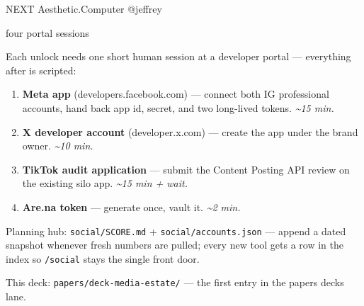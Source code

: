 \documentclass[12pt]{article}
\makeatletter
\newcommand{\ac}{Aesthetic\textcolor{acpink}{.}Computer}
\newenvironment{slide}[2]{%
  \clearpage
  {\footnotesize\color{acgray}\MakeUppercase{#1}\hfill}%
  {\footnotesize\color{acgray}\ac{} \textperiodcentered{} @jeffrey}\par
  \vspace{0.1em}
  {\acbold\fontsize{31pt}{35pt}\selectfont\color{acdark}#2\par}
  \vspace{0.9em}
  \large
}{%
  \vfill
  {\hfill\footnotesize\color{acgray}\thepage}%
}
\makeatother
\begin{document}
\begin{slide}{next}{four portal sessions}
Each unlock needs one short human session at a developer portal --- everything after is scripted:

\vspace{0.9em}
\begin{enumerate}[leftmargin=2.2em, itemsep=0.55em]
  \item \textbf{Meta app} (developers.facebook.com) --- connect both IG professional
        accounts, hand back app id, secret, and two long-lived tokens. \textit{\textasciitilde 15 min.}
  \item \textbf{X developer account} (developer.x.com) --- create the app under the
        brand owner. \textit{\textasciitilde 10 min.}
  \item \textbf{TikTok audit application} --- submit the Content Posting API review
        on the existing silo app. \textit{\textasciitilde 15 min + wait.}
  \item \textbf{Are.na token} --- generate once, vault it. \textit{\textasciitilde 2 min.}
\end{enumerate}

\vspace{1.1em}
Planning hub: \texttt{social/SCORE.md} + \texttt{social/accounts.json} ---
append a dated snapshot whenever fresh numbers are pulled; every new tool gets a row
in the index so \texttt{/social} stays the single front door.

\vspace{0.9em}
{\color{acgray}\small This deck: \texttt{papers/deck-media-estate/} --- the first entry
in the papers decks lane.}
\end{slide}
\end{document}
